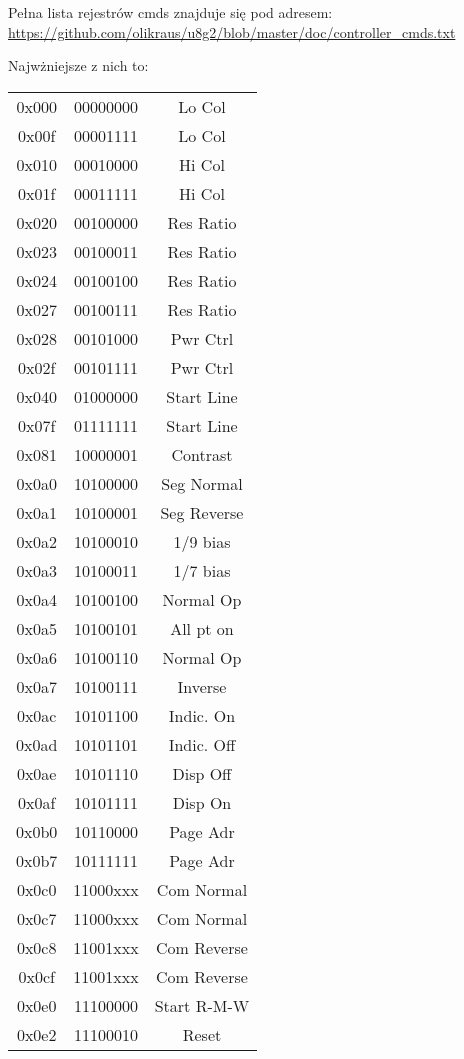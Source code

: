 \documentclass{classrep}
\begin{document}
Pełna lista rejestrów cmds znajduje się pod adresem:\\
\url{https://github.com/olikraus/u8g2/blob/master/doc/controller_cmds.txt}

Najwżniejsze z nich to:\\

\begin{center}
\begin{tabular}{ c c c }
0x000 & 00000000 & Lo Col \\
0x00f & 00001111 & Lo Col \\
0x010 & 00010000 & Hi Col \\
0x01f & 00011111 & Hi Col \\
0x020 & 00100000 & Res Ratio   \\
0x023 & 00100011 & Res Ratio \\
0x024 & 00100100 & Res Ratio \\
0x027 & 00100111 & Res Ratio \\
0x028 & 00101000 & Pwr Ctrl \\
0x02f & 00101111 & Pwr Ctrl \\
0x040 & 01000000 & Start Line \\
0x07f & 01111111 & Start Line \\
0x081 & 10000001 & Contrast \\
0x0a0 & 10100000 & Seg Normal \\
0x0a1 & 10100001 & Seg Reverse \\
0x0a2 & 10100010 & 1/9 bias \\
0x0a3 & 10100011 & 1/7 bias \\
0x0a4 & 10100100 & Normal Op \\
0x0a5 & 10100101 & All pt on \\
0x0a6 & 10100110 & Normal Op \\
0x0a7 & 10100111 & Inverse \\
0x0ac & 10101100 & Indic. On \\
0x0ad & 10101101 & Indic. Off \\
0x0ae & 10101110 & Disp Off \\
0x0af & 10101111 & Disp On \\
0x0b0 & 10110000 & Page Adr \\
0x0b7 & 10111111 & Page Adr \\
0x0c0 & 11000xxx & Com Normal \\
0x0c7 & 11000xxx & Com Normal \\
0x0c8 & 11001xxx & Com Reverse \\
0x0cf & 11001xxx & Com Reverse \\
0x0e0 & 11100000 & Start R-M-W \\
0x0e2 & 11100010 & Reset
\end{tabular}
\end{center}
\end{document}
